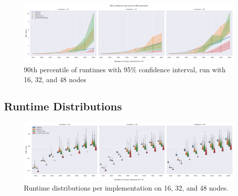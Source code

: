 \documentclass[letterpaper]{article}
\begin{document}
\begin{figure}[H]
    \centering
    \includegraphics[width=\columnwidth]{plots/runtime_numprocs_16_32_48_N_percentile_90_CI_0.95_with_errorbar.pdf}
    \caption{90th percentile of runtimes with 95\% confidence interval, run with 16, 32, and 48 nodes}
\end{figure}

\subsection{Runtime Distributions}

\begin{figure}[H]
    \centering
    \includegraphics[width=\columnwidth]{plots/cmp_numprocs_16_32_48_log_scale.pdf}
    \caption{Runtime distributions per implementation on 16, 32, and 48 nodes.}
\end{figure}
\end{document}
